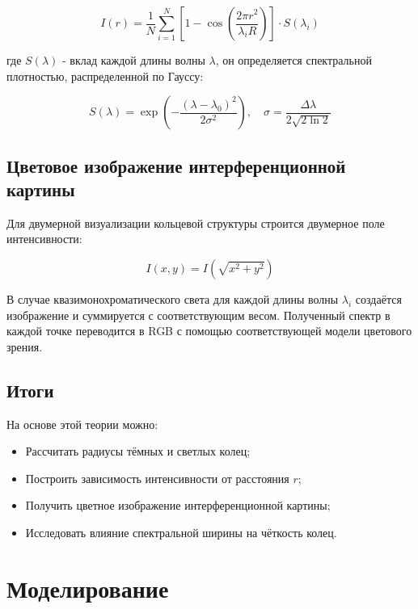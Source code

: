 \documentclass[a4paper,11pt]{article}
\theoremstyle{definition}
\begin{document}
    \begin{equation}
        I(r) = \frac{1}{N} \sum_{i=1}^{N} \left[1 - \cos\left( \frac{2\pi r^2}{\lambda_i R} \right) \right] \cdot S(\lambda_i)\label{eq:equation7}
    \end{equation}

    где \( S(\lambda) \) - вклад каждой длины волны \(\lambda\), он определяется спектральной плотностью,
    распределенной по Гауссу:

    \begin{equation}
        S(\lambda) = \exp\left( -\frac{(\lambda - \lambda_0)^2}{2\sigma^2} \right), \quad \sigma = \frac{\Delta\lambda}{2\sqrt{2 \ln 2}}\label{eq:equation8}
    \end{equation}

    \subsection{Цветовое изображение интерференционной картины}
    Для двумерной визуализации кольцевой структуры строится двумерное поле интенсивности:

    \begin{equation}
        I(x, y) = I\left( \sqrt{x^2 + y^2} \right)\label{eq:equation9}
    \end{equation}

    В случае квазимонохроматического света для каждой длины волны \( \lambda_i \) создаётся изображение
    и суммируется с соответствующим весом. Полученный спектр в каждой точке переводится в RGB с помощью
    соответствующей модели цветового зрения.

    \subsection{Итоги}
    На основе этой теории можно:
    \begin{itemize}
        \item Рассчитать радиусы тёмных и светлых колец;
        \item Построить зависимость интенсивности от расстояния \( r \);
        \item Получить цветное изображение интерференционной картины;
        \item Исследовать влияние спектральной ширины на чёткость колец.
    \end{itemize}


    \newpage
    \section{Моделирование}
\end{document}
